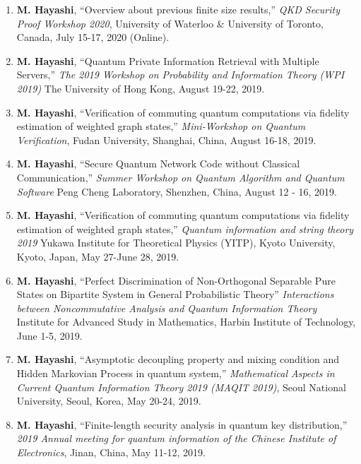 \documentclass[a4paper,12pt,oneside]{article}
\begin{document}
\begin{enumerate}
\item 
\textbf{M. Hayashi}, 
``Overview about previous finite size results,''
{\em  QKD Security Proof Workshop 2020}, 
University of Waterloo \& University of Toronto,
Canada, July 15-17, 2020 (Online). 

\item 
\textbf{M. Hayashi}, 
``Quantum Private Information Retrieval with Multiple Servers,''
{\em  The 2019 Workshop on Probability and Information Theory (WPI 2019)}
The University of Hong Kong, 
August 19-22, 2019. 

\item 
\textbf{M. Hayashi}, 
``Verification of commuting quantum computations via fidelity estimation of weighted graph states,''
{\em Mini-Workshop on Quantum Verification}, 
Fudan University, Shanghai, China,
August 16-18, 2019.

\item 
\textbf{M. Hayashi}, 
``Secure Quantum Network Code without Classical Communication,''
{\em  Summer Workshop on Quantum Algorithm and Quantum Software}
Peng Cheng Laboratory, Shenzhen, China,
August 12 - 16, 2019.

\item 
\textbf{M. Hayashi}, 
``Verification of commuting quantum computations via fidelity estimation of weighted graph states,''
{\em  Quantum information and string theory 2019}
Yukawa Institute for Theoretical Physics (YITP), Kyoto University, Kyoto, Japan,
May 27-June 28, 2019.

\item 
\textbf{M. Hayashi}, 
``Perfect Discrimination of Non-Orthogonal Separable Pure States on Bipartite System in General Probabilistic Theory''
{\em  Interactions between Noncommutative Analysis and Quantum Information Theory}
Institute for Advanced Study in Mathematics, Harbin Institute of Technology,
June 1-5, 2019.

\item 
\textbf{M. Hayashi}, 
``Asymptotic decoupling property and mixing condition and Hidden Markovian Process in quantum system,''
{\em Mathematical Aspects in Current Quantum Information Theory 2019 (MAQIT 2019)}, 
Seoul National University, Seoul, Korea,
May 20-24, 2019. 

\item 
\textbf{M. Hayashi}, 
``Finite-length security analysis in quantum key distribution,''
{\em 2019 Annual meeting for quantum information of the Chinese Institute of Electronics},
Jinan, China,
May 11-12, 2019.


\end{enumerate}
\end{document}
